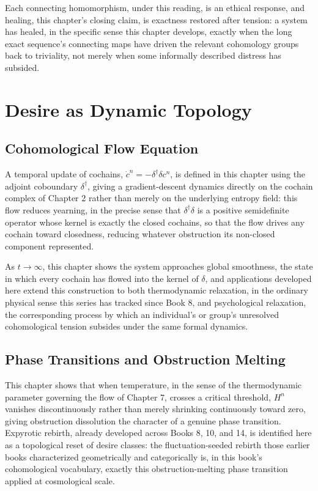 Each connecting homomorphism, under this reading, is an ethical response, and healing, this chapter's closing claim, is exactness restored after tension: a system has healed, in the specific sense this chapter develops, exactly when the long exact sequence's connecting maps have driven the relevant cohomology groups back to triviality, not merely when some informally described distress has subsided.

\part{Desire as Dynamic Topology}

\chapter{Cohomological Flow Equation}

A temporal update of cochains, $\dot{c}^n = -\delta^\dagger \delta c^n$, is defined in this chapter using the adjoint coboundary $\delta^\dagger$, giving a gradient-descent dynamics directly on the cochain complex of Chapter 2 rather than merely on the underlying entropy field: this flow reduces yearning, in the precise sense that $\delta^\dagger \delta$ is a positive semidefinite operator whose kernel is exactly the closed cochains, so that the flow drives any cochain toward closedness, reducing whatever obstruction its non-closed component represented.

As $t \to \infty$, this chapter shows the system approaches global smoothness, the state in which every cochain has flowed into the kernel of $\delta$, and applications developed here extend this construction to both thermodynamic relaxation, in the ordinary physical sense this series has tracked since Book 8, and psychological relaxation, the corresponding process by which an individual's or group's unresolved cohomological tension subsides under the same formal dynamics.

\chapter{Phase Transitions and Obstruction Melting}

This chapter shows that when temperature, in the sense of the thermodynamic parameter governing the flow of Chapter 7, crosses a critical threshold, $H^n$ vanishes discontinuously rather than merely shrinking continuously toward zero, giving obstruction dissolution the character of a genuine phase transition. Expyrotic rebirth, already developed across Books 8, 10, and 14, is identified here as a topological reset of desire classes: the fluctuation-seeded rebirth those earlier books characterized geometrically and categorically is, in this book's cohomological vocabulary, exactly this obstruction-melting phase transition applied at cosmological scale.

